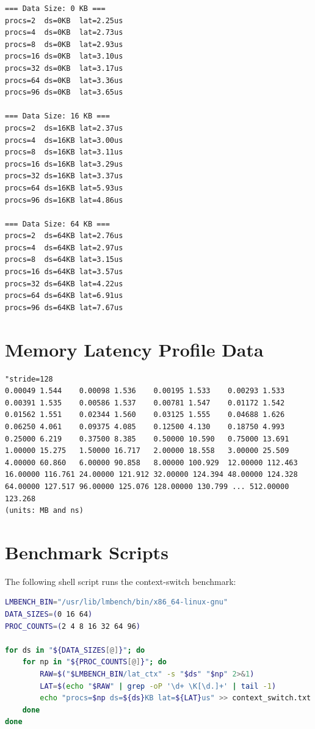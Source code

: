 \documentclass[12pt,a4paper]{article}
\begin{document}
\begin{verbatim}
=== Data Size: 0 KB ===
procs=2  ds=0KB  lat=2.25us
procs=4  ds=0KB  lat=2.73us
procs=8  ds=0KB  lat=2.93us
procs=16 ds=0KB  lat=3.10us
procs=32 ds=0KB  lat=3.17us
procs=64 ds=0KB  lat=3.36us
procs=96 ds=0KB  lat=3.65us

=== Data Size: 16 KB ===
procs=2  ds=16KB lat=2.37us
procs=4  ds=16KB lat=3.00us
procs=8  ds=16KB lat=3.11us
procs=16 ds=16KB lat=3.29us
procs=32 ds=16KB lat=3.37us
procs=64 ds=16KB lat=5.93us
procs=96 ds=16KB lat=4.86us

=== Data Size: 64 KB ===
procs=2  ds=64KB lat=2.76us
procs=4  ds=64KB lat=2.97us
procs=8  ds=64KB lat=3.15us
procs=16 ds=64KB lat=3.57us
procs=32 ds=64KB lat=4.22us
procs=64 ds=64KB lat=6.91us
procs=96 ds=64KB lat=7.67us
\end{verbatim}

\section{Memory Latency Profile Data}
\label{app:mem}

\begin{verbatim}
"stride=128
0.00049 1.544    0.00098 1.536    0.00195 1.533    0.00293 1.533
0.00391 1.535    0.00586 1.537    0.00781 1.547    0.01172 1.542
0.01562 1.551    0.02344 1.560    0.03125 1.555    0.04688 1.626
0.06250 4.061    0.09375 4.085    0.12500 4.130    0.18750 4.993
0.25000 6.219    0.37500 8.385    0.50000 10.590   0.75000 13.691
1.00000 15.275   1.50000 16.717   2.00000 18.558   3.00000 25.509
4.00000 60.860   6.00000 90.858   8.00000 100.929  12.00000 112.463
16.00000 116.761 24.00000 121.912 32.00000 124.394 48.00000 124.328
64.00000 127.517 96.00000 125.076 128.00000 130.799 ... 512.00000 123.268
(units: MB and ns)
\end{verbatim}

\section{Benchmark Scripts}
\label{app:scripts}

The following shell script runs the context-switch benchmark:

\begin{lstlisting}[language=bash, caption=bench\_context\_switch.sh (excerpt)]
LMBENCH_BIN="/usr/lib/lmbench/bin/x86_64-linux-gnu"
DATA_SIZES=(0 16 64)
PROC_COUNTS=(2 4 8 16 32 64 96)

for ds in "${DATA_SIZES[@]}"; do
    for np in "${PROC_COUNTS[@]}"; do
        RAW=$("$LMBENCH_BIN/lat_ctx" -s "$ds" "$np" 2>&1)
        LAT=$(echo "$RAW" | grep -oP '\d+ \K[\d.]+' | tail -1)
        echo "procs=$np ds=${ds}KB lat=${LAT}us" >> context_switch.txt
    done
done
\end{lstlisting}
\end{document}
